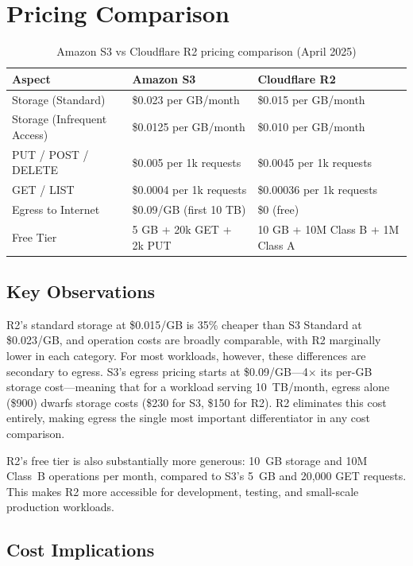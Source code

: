 \section{Pricing Comparison}\label{sec:pricing-comparison}

\begin{table}[H]
\centering
\caption{Amazon S3 vs Cloudflare R2 pricing comparison (April 2025)}
\label{tab:s3-r2-pricing-comparison}
\begin{tabular}{p{4.5cm}p{5cm}p{5cm}}
\hline
\textbf{Aspect} & \textbf{Amazon S3} & \textbf{Cloudflare R2} \\
\hline
Storage (Standard) & \$0.023 per GB/month & \$0.015 per GB/month \\
Storage (Infrequent Access) & \$0.0125 per GB/month & \$0.010 per GB/month \\
PUT / POST / DELETE & \$0.005 per 1k requests & \$0.0045 per 1k requests \\
GET / LIST & \$0.0004 per 1k requests & \$0.00036 per 1k requests \\
Egress to Internet & \$0.09/GB (first 10 TB) & \$0 (free) \\
Free Tier & 5 GB + 20k GET + 2k PUT & 10 GB + 10M Class B + 1M Class A \\
\hline
\end{tabular}
\end{table}

\subsection{Key Observations}

R2's standard storage at \$0.015/GB is 35\% cheaper than S3 Standard at \$0.023/GB, and operation costs are broadly comparable, with R2 marginally lower in each category. For most workloads, however, these differences are secondary to egress. S3's egress pricing starts at \$0.09/GB---4$\times$ its per-GB storage cost---meaning that for a workload serving 10~TB/month, egress alone (\$900) dwarfs storage costs (\$230 for S3, \$150 for R2). R2 eliminates this cost entirely, making egress the single most important differentiator in any cost comparison.

R2's free tier is also substantially more generous: 10~GB storage and 10M Class~B operations per month, compared to S3's 5~GB and 20,000 GET requests. This makes R2 more accessible for development, testing, and small-scale production workloads.

\subsection{Cost Implications}

